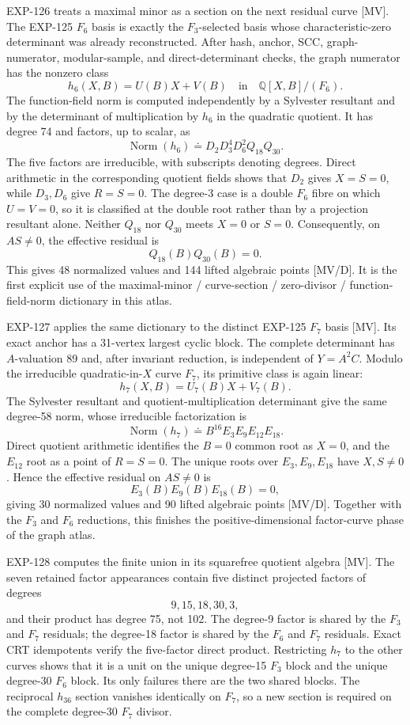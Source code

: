 \documentclass[11pt]{article}
\theoremstyle{remark}
\newcommand{\Q}{\mathbb{Q}}
\begin{document}
EXP-126 treats a maximal minor as a section on the next residual curve
[MV]. The EXP-125 \(F_6\) basis is exactly the \(F_3\)-selected basis
whose characteristic-zero determinant was already reconstructed. After
hash, anchor, SCC, graph-numerator, modular-sample, and direct-determinant
checks, the graph numerator has the nonzero class
\[
 h_6(X,B)=U(B)X+V(B)
 \quad\text{in}\quad \Q[X,B]/(F_6).
\]
The function-field norm is computed independently by a Sylvester resultant
and by the determinant of multiplication by \(h_6\) in the quadratic
quotient. It has degree 74 and factors, up to scalar, as
\[
 \operatorname{Norm}(h_6)
 \doteq D_2D_3^4D_6^2Q_{18}Q_{30}.
\]
The five factors are irreducible, with subscripts denoting degrees. Direct
arithmetic in the corresponding quotient fields shows that \(D_2\) gives
\(X=S=0\), while \(D_3,D_6\) give \(R=S=0\). The degree-3 case is a double
\(F_6\) fibre on which \(U=V=0\), so it is classified at the double root
rather than by a projection resultant alone. Neither \(Q_{18}\) nor
\(Q_{30}\) meets \(X=0\) or \(S=0\). Consequently, on \(AS\ne0\), the
effective residual is
\[
 Q_{18}(B)Q_{30}(B)=0.
\]
This gives 48 normalized values and 144 lifted algebraic points [MV/D].
It is the first explicit use of the maximal-minor / curve-section /
zero-divisor / function-field-norm dictionary in this atlas.

EXP-127 applies the same dictionary to the distinct EXP-125 \(F_7\) basis
[MV]. Its exact anchor has a 31-vertex largest cyclic block. The complete
determinant has \(A\)-valuation 89 and, after invariant reduction, is
independent of \(Y=A^2C\). Modulo the irreducible quadratic-in-\(X\) curve
\(F_7\), its primitive class is again linear:
\[
 h_7(X,B)=U_7(B)X+V_7(B).
\]
The Sylvester resultant and quotient-multiplication determinant give the
same degree-58 norm, whose irreducible factorization is
\[
 \operatorname{Norm}(h_7)
 \doteq B^{16}E_3E_9E_{12}E_{18}.
\]
Direct quotient arithmetic identifies the \(B=0\) common root as \(X=0\),
and the \(E_{12}\) root as a point of \(R=S=0\). The unique roots over
\(E_3,E_9,E_{18}\) have \(X,S\ne0\). Hence the effective residual on
\(AS\ne0\) is
\[
 E_3(B)E_9(B)E_{18}(B)=0,
\]
giving 30 normalized values and 90 lifted algebraic points [MV/D].
Together with the \(F_3\) and \(F_6\) reductions, this finishes the
positive-dimensional factor-curve phase of the graph atlas.

EXP-128 computes the finite union in its squarefree quotient algebra [MV].
The seven retained factor appearances contain five distinct projected
factors of degrees
\[
  9,15,18,30,3,
\]
and their product has degree 75, not 102. The degree-9 factor is shared by
the \(F_3\) and \(F_7\) residuals; the degree-18 factor is shared by the
\(F_6\) and \(F_7\) residuals. Exact CRT idempotents verify the five-factor
direct product. Restricting \(h_7\) to the other curves shows that it is a
unit on the unique degree-15 \(F_3\) block and the unique degree-30 \(F_6\)
block. Its only failures there are the two shared blocks. The reciprocal
\(h_{36}\) section vanishes identically on \(F_7\), so a new section is
required on the complete degree-30 \(F_7\) divisor.
\end{document}
